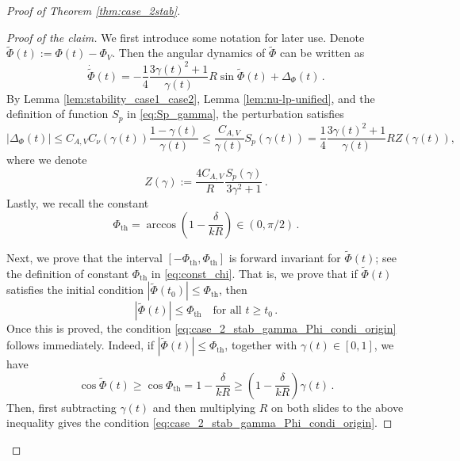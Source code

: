 \documentclass[10pt]{article}
\theoremstyle{definition}
\theoremstyle{definition}
\numberwithin{equation}{section}
\newcommand{\DeltaPhi}{\Delta_{\Phi}}
\newcommand{\PhiV}{\Phi_{V}}
\newcommand{\WPhi}{\widetilde{\Phi}}
\newcommand{\PhiTH}{\Phi_{\mathrm{th}}}
\begin{document}
\begin{proof}[Proof of Theorem \ref{thm:case_2stab}]
\begin{proof}[Proof of the claim]
We first introduce some notation for later use.
Denote $\WPhi(t) := \Phi(t) - \PhiV$.
Then the angular dynamics of $\WPhi$ can be written as
\begin{equation}\label{eq:case2_angular_eq_aux}
\Dot{\WPhi} (t) = -\frac{1}{4} \frac{3\gamma(t)^2 + 1}{\gamma(t)} R \sin \WPhi (t) + \DeltaPhi (t) \, .
\end{equation}
By Lemma \ref{lem:stability_case1_case2}, Lemma \ref{lem:nu-lp-unified}, and the definition of function $S_p$ in \eqref{eq:Sp_gamma}, the perturbation satisfies
\begin{equation}\label{eq:case2_deltaPhi_bound}
|\DeltaPhi (t)| \leq C_{A, V} C_{\nu} (\gamma(t)) \frac{1 - \gamma(t)}{\gamma(t)} \leq \frac{C_{A,V}}{\gamma(t)} S_p(\gamma(t)) = \frac{1}{4} \frac{3\gamma(t)^2 + 1}{\gamma(t)} R Z(\gamma(t)),
\end{equation}
where we denote
\begin{equation}\label{eq:Z_gamma}
Z(\gamma) := \frac{4 C_{A,V}}{R} \frac{S_p(\gamma)}{3 \gamma^2 + 1} \, .
\end{equation}
Lastly, we recall the constant
\begin{equation}\label{eq:const_chi}
    \PhiTH = \arccos \left(1 - \frac{\delta}{kR} \right) \in (0, \pi/2) \, .
\end{equation}

Next, we prove that the interval $[-\PhiTH, \PhiTH]$ is forward invariant for $\WPhi(t)$; see the definition of constant $\PhiTH$ in \eqref{eq:const_chi}.
That is, we prove that if $\WPhi(t)$ satisfies the initial condition $| \WPhi (t_0) | \leq \PhiTH$, then
\begin{equation*}
 | \WPhi (t) | \leq \PhiTH \quad \text{for all } t \geq t_0 \, .
\end{equation*}
Once this is proved, the condition \eqref{eq:case_2_stab_gamma_Phi_condi_origin} follows immediately.
Indeed, if $|\WPhi(t)| \leq \PhiTH$, together with $\gamma(t) \in [0,1]$, we have
\begin{equation*}
\cos \WPhi (t) \geq \cos \PhiTH = 1 - \frac{\delta}{kR} \geq \left( 1 - \frac{\delta}{kR} \right) \gamma(t) \, .
\end{equation*}
Then, first subtracting $\gamma(t)$ and then multiplying $R$ on both slides to the above inequality gives the condition \eqref{eq:case_2_stab_gamma_Phi_condi_origin}.


\end{proof}
\end{proof}
\end{document}
